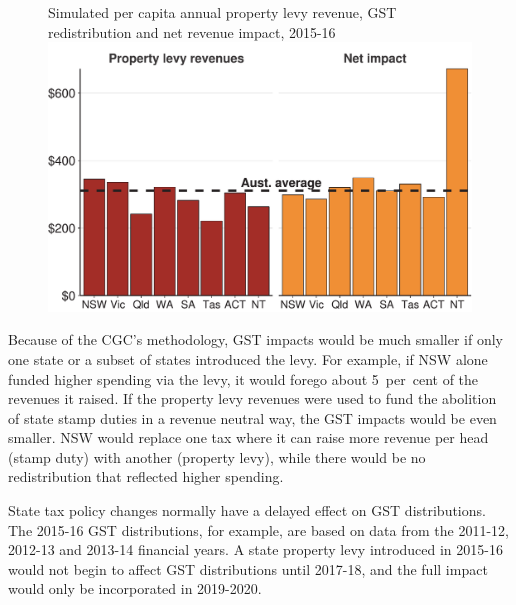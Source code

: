 \documentclass[twoside,english]{Dianab5ona4portrait}
\begin{document}
\begin{figure}
%
{Simulated per capita annual property levy revenue, GST redistribution and net revenue impact, 2015-16}%
\includegraphics[width=\columnwidth]{Property-taxes/atlas/figure/Figure7-1.pdf}

\end{figure}

Because of the CGC’s methodology, GST impacts would be much smaller if only one state or a subset of states introduced the levy. For example, if NSW alone funded higher spending via the levy, it would forego about 5~per~cent of the revenues it raised. If the property levy revenues were used to fund the abolition of state stamp duties in a revenue neutral way, the GST impacts would be even smaller. NSW would replace one tax where it can raise more revenue per head (stamp duty) with another (property levy), while there would be no redistribution that reflected higher spending.  

State tax policy changes normally have a delayed effect on GST distributions. The 2015-16 GST distributions, for example, are based on data from the 2011-12, 2012-13 and 2013-14 financial years. A state property levy introduced in 2015-16 would not begin to affect GST distributions until 2017-18, and the full impact would only be incorporated in 2019-2020. 
\end{document}
